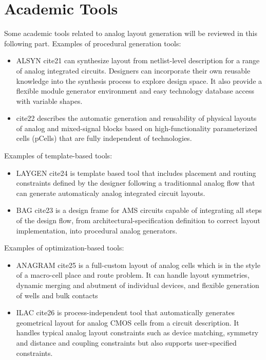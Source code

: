 \chapter{Academic Tools}
Some academic tools related to analog layout generation will be reviewed in this following part. 
\newline 
\newline 
\indent Examples of procedural generation tools:
\begin{itemize}
\item ALSYN cite{21} can synthesize layout from netlist-level description for a range of analog integrated circuits. Designers can incorporate their own reusable knowledge into the synthesis process to explore design space. It also provide a flexible module generator environment and easy technology database access with variable shapes.
\item cite{22} describes the automatic generation and reusability of physical layouts of analog and mixed-signal blocks based on high-functionality parameterized cells (pCells) that are fully independent of technologies.
\end{itemize}

Examples of template-based tools:
\begin{itemize}
\item LAYGEN cite{24} is template based tool that includes placement and routing constraints defined by the designer following a traditionnal analog flow that can generate automaticaly analog integrated circuit layouts.
\item BAG cite{23} is a design frame for AMS circuits capable of integrating all steps of the design flow, from architectural-specification definition to correct layout implementation, into procedural analog generators.
\end{itemize}
Examples of optimization-based tools:
\begin{itemize}
\item ANAGRAM cite{25} is a full-custom layout of analog cells which is in the style of a macro-cell place and route problem. It can handle layout symmetries, dynamic merging and abutment of individual devices, and flexible generation of wells and bulk contacts
\item ILAC cite{26} is process-independent tool that automatically generates geometrical layout for analog CMOS cells from a circuit description. It handles typical analog layout constraints such as device matching, symmetry and distance and coupling constraints but also supports user-specified constraints.
\end{itemize}